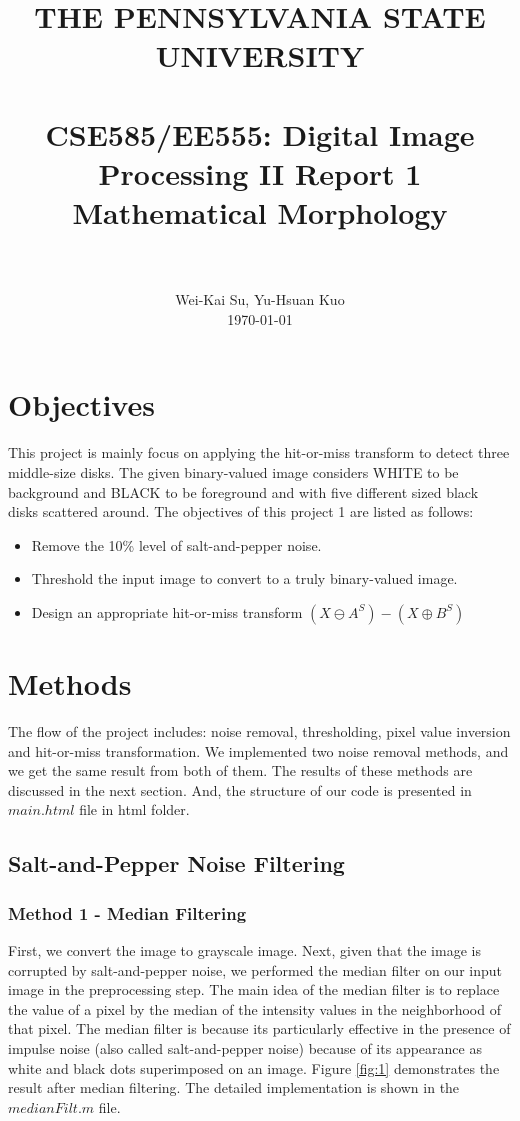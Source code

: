 \documentclass[paper=a4, fontsize=11pt]{scrartcl}
\title{
	\normalfont \normalsize \textsc{THE PENNSYLVANIA STATE UNIVERSITY} \\ [25pt]
	\horrule{1pt} \\[0.4cm]
	\huge {\bf CSE585/EE555: Digital Image Processing II Report 1 \\ Mathematical Morphology} \\
	\horrule{2pt} \\[0.5cm]
}
\author{
	\normalfont \normalsize
	 Wei-Kai Su, Yu-Hsuan Kuo\\[-3pt] \normalsize
  \today
}
\date{}
\begin{document}
\maketitle

\section{Objectives}
This project is mainly focus on applying the hit-or-miss transform to detect three middle-size disks. The given binary-valued image considers WHITE to be background and BLACK to be foreground and with five different sized black disks scattered around. The objectives of this project 1 are listed as follows: 

\begin{itemize}
	\item Remove the 10\% level of salt-and-pepper noise.
	\item Threshold the input image to convert to a truly binary-valued image.
	\item Design an appropriate hit-or-miss transform $( X \ominus A^S) - ( X  \oplus  B^S)$

\end{itemize}



\section{Methods}

The flow of the project includes: noise removal, thresholding, pixel value inversion and  hit-or-miss transformation. We implemented two noise removal methods, and we get the same result from both of them. The results of these methods are discussed in the next section. And, the structure of our code is presented in $main.html$ file in html folder.
\subsection{Salt-and-Pepper Noise Filtering}

\subsubsection{Method 1 - Median Filtering}
First, we convert the image to grayscale image. Next, given that the image is corrupted by salt-and-pepper noise, we performed the median filter on our input image in the preprocessing step. The main idea of the median filter is to replace the value of a pixel by the median of the intensity values in the neighborhood of that pixel. The median filter is because its particularly effective in the presence of impulse noise (also called salt-and-pepper noise) because of its appearance as white and black dots superimposed on an image. Figure \ref{fig:1} demonstrates the result after median filtering. The detailed implementation is shown in the $medianFilt.m $ file.  %
\end{document}
